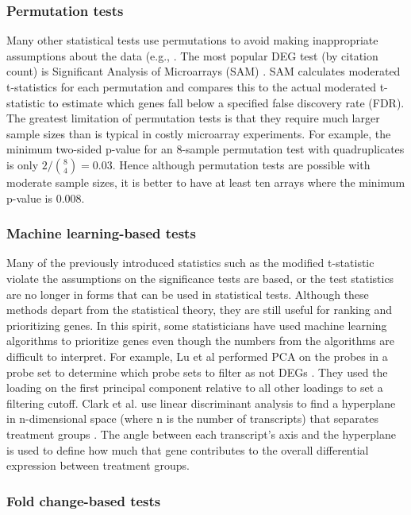 \subsubsection{Permutation tests}
Many other statistical tests use permutations to avoid
making inappropriate assumptions about the data (e.g., \cite{Yan:2005tc, Efron:2001uu}.
The most popular DEG test (by citation count) is Significant
Analysis of Microarrays (SAM) \cite{Tusher:2001kk}. SAM calculates moderated t-statistics
for each permutation and compares this to the actual moderated t-statistic
to estimate which genes fall below a specified 
false discovery rate (FDR).
The greatest limitation of permutation tests is that they
require much larger sample sizes than is typical in
costly microarray experiments. For example, the minimum
two-sided p-value for an 8-sample permutation test with quadruplicates
is only $2/{8 \choose 4}=0.03$. Hence although permutation tests
are possible with moderate sample sizes, it is better to have at 
least ten arrays where the minimum p-value is 0.008.


\subsubsection{Machine learning-based tests}
Many of the previously introduced statistics such as the 
modified t-statistic violate the assumptions on the significance tests
are based, or the test statistics are no longer in forms
that can be used in statistical tests.
Although these methods depart from the statistical
theory, they are still useful
for ranking and prioritizing genes. In this spirit,
some statisticians have used machine learning algorithms
to prioritize genes even though the numbers from the
algorithms are difficult to interpret. For example, Lu et al
performed PCA on the probes in a probe set to determine
which probe sets to filter as not DEGs \cite{Lu:2011ba}. They used the
loading on the first principal component relative to
all other loadings to set a filtering cutoff.
Clark et al. use linear discriminant analysis to find
a hyperplane in n-dimensional space (where n is the number of transcripts)
that separates treatment groups \cite{Clark:2014du}. 
The angle between each transcript's axis
and the hyperplane is used to define how much that gene contributes to the overall
differential expression between treatment groups.


\subsubsection{Fold change-based tests}


